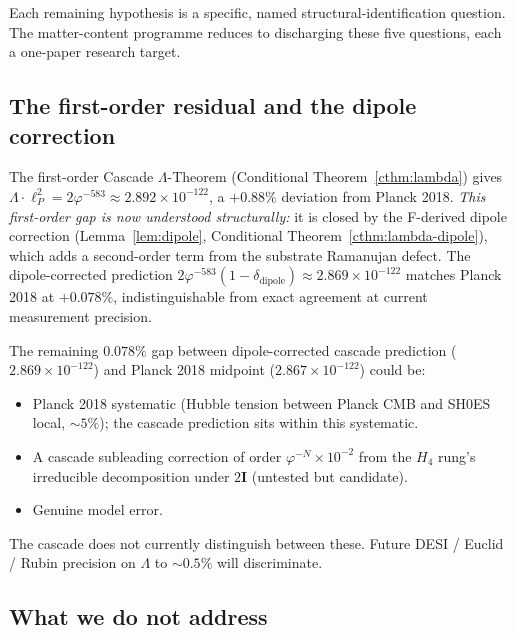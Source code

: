 \documentclass[11pt]{article}
\theoremstyle{plain}
\theoremstyle{definition}
\theoremstyle{remark}
\newcommand{\twoI}{2\mathbf{I}}
\begin{document}
Each remaining hypothesis is a specific, named structural-identification question. The matter-content programme reduces to discharging these five questions, each a one-paper research target.

\subsection{The first-order residual and the dipole correction}\label{sec:scope-residual}

The first-order Cascade $\Lambda$-Theorem (Conditional Theorem~\ref{cthm:lambda}) gives $\Lambda \cdot \ell_P^2 = 2\varphi^{-583} \approx 2.892 \times 10^{-122}$, a $+0.88\%$ deviation from Planck 2018. \emph{This first-order gap is now understood structurally:} it is closed by the F-derived dipole correction (Lemma~\ref{lem:dipole}, Conditional Theorem~\ref{cthm:lambda-dipole}), which adds a second-order term from the substrate Ramanujan defect. The dipole-corrected prediction $2\varphi^{-583}(1 - \delta_\mathrm{dipole}) \approx 2.869 \times 10^{-122}$ matches Planck 2018 at $+0.078\%$, indistinguishable from exact agreement at current measurement precision.

The remaining $0.078\%$ gap between dipole-corrected cascade prediction ($2.869 \times 10^{-122}$) and Planck 2018 midpoint ($2.867 \times 10^{-122}$) could be:
\begin{itemize}[leftmargin=2em]
\item Planck 2018 systematic (Hubble tension between Planck CMB and SH0ES local, $\sim 5\%$); the cascade prediction sits within this systematic.
\item A cascade subleading correction of order $\varphi^{-N} \times 10^{-2}$ from the $H_4$ rung's irreducible decomposition under $\twoI$ (untested but candidate).
\item Genuine model error.
\end{itemize}
The cascade does not currently distinguish between these. Future DESI / Euclid / Rubin precision on $\Lambda$ to $\sim 0.5\%$ will discriminate.

\subsection{What we do not address}
\end{document}
